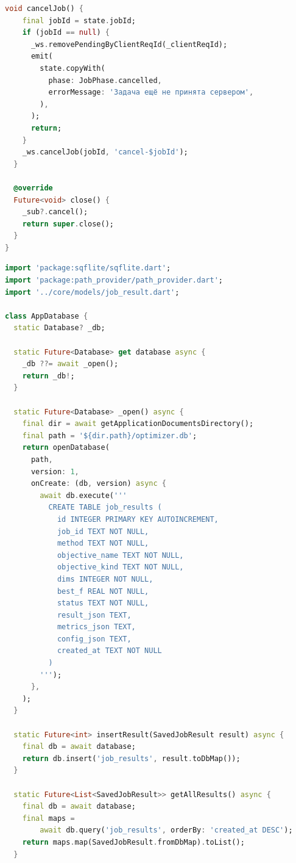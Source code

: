 \begin{lstlisting}[language=Dart, caption={Обработка прогресса выполнения и накопление истории сходимости (mobile/lib/features/progress/progress\_cubit.dart)}, label={lst:progress-cubit-dart}]
  void cancelJob() {
    final jobId = state.jobId;
    if (jobId == null) {
      _ws.removePendingByClientReqId(_clientReqId);
      emit(
        state.copyWith(
          phase: JobPhase.cancelled,
          errorMessage: 'Задача ещё не принята сервером',
        ),
      );
      return;
    }
    _ws.cancelJob(jobId, 'cancel-$jobId');
  }

  @override
  Future<void> close() {
    _sub?.cancel();
    return super.close();
  }
}
\end{lstlisting}


\begin{lstlisting}[language=Dart, caption={Локальное хранение результатов экспериментов (mobile/lib/storage/database.dart)}, label={lst:database-dart}]
import 'package:sqflite/sqflite.dart';
import 'package:path_provider/path_provider.dart';
import '../core/models/job_result.dart';

class AppDatabase {
  static Database? _db;

  static Future<Database> get database async {
    _db ??= await _open();
    return _db!;
  }

  static Future<Database> _open() async {
    final dir = await getApplicationDocumentsDirectory();
    final path = '${dir.path}/optimizer.db';
    return openDatabase(
      path,
      version: 1,
      onCreate: (db, version) async {
        await db.execute('''
          CREATE TABLE job_results (
            id INTEGER PRIMARY KEY AUTOINCREMENT,
            job_id TEXT NOT NULL,
            method TEXT NOT NULL,
            objective_name TEXT NOT NULL,
            objective_kind TEXT NOT NULL,
            dims INTEGER NOT NULL,
            best_f REAL NOT NULL,
            status TEXT NOT NULL,
            result_json TEXT,
            metrics_json TEXT,
            config_json TEXT,
            created_at TEXT NOT NULL
          )
        ''');
      },
    );
  }

  static Future<int> insertResult(SavedJobResult result) async {
    final db = await database;
    return db.insert('job_results', result.toDbMap());
  }

  static Future<List<SavedJobResult>> getAllResults() async {
    final db = await database;
    final maps =
        await db.query('job_results', orderBy: 'created_at DESC');
    return maps.map(SavedJobResult.fromDbMap).toList();
  }


\end{lstlisting}
